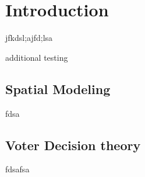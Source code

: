 \documentclass{mitthesis}
\begin{document}
\chapter{Introduction}

jfkdsl;ajfd;lsa

additional testing

\section{Spatial Modeling}
fdsa

\section{Voter Decision theory}

fdsafsa
\end{document}

